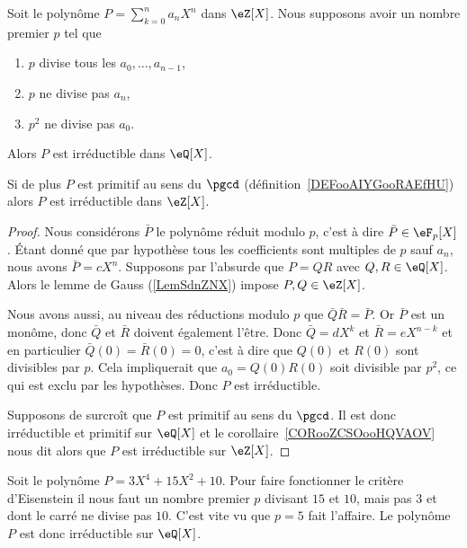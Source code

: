 \begin{proposition}
    Soit le polynôme \( P=\sum_{k=0}^n a_nX^n\) dans \( \eZ[X]\). Nous supposons avoir un nombre premier \( p\) tel que
    \begin{enumerate}
        \item
            \( p\) divise tous les \( a_0,\ldots, a_{n-1}\),
        \item
            \( p\) ne divise pas \( a_n\),
        \item
            \( p^2\) ne divise pas \( a_0\).
    \end{enumerate}
    Alors \( P\) est irréductible dans \( \eQ[X]\).

    Si de plus \( P\) est primitif au sens du \( \pgcd\) (définition~\ref{DEFooAIYGooRAEfHU}) alors \( P\) est irréductible dans \( \eZ[X]\).
\end{proposition}

\begin{proof}
    Nous considérons \( \bar P\) le polynôme réduit modulo \( p\), c'est à dire \( \bar P\in \eF_p[X]\). Étant donné que par hypothèse tous les coefficients sont multiples de \( p\) sauf \( a_n\), nous avons \( \bar P=cX^n\). Supposons par l'absurde que \( P=QR\) avec \( Q,R\in \eQ[X]\). Alors le lemme de Gauss (\ref{LemSdnZNX}) impose \( P,Q\in \eZ[X]\).

    Nous avons aussi, au niveau des réductions modulo \( p\) que $\bar Q\bar R=\bar P$. Or \( \bar P\) est un monôme, donc \( \bar Q\) et \( \bar R\) doivent également l'être. Donc \( \bar Q=dX^k\) et \( \bar R=eX^{n-k}\) et en particulier \( \bar Q(0)=\bar R(0)=0\), c'est à dire que \( Q(0)\) et \( R(0)\) sont divisibles par \( p\). Cela impliquerait que \( a_0=Q(0)R(0)\) soit divisible par \( p^2\), ce qui est exclu par les hypothèses. Donc \( P\) est irréductible.

    Supposons de surcroît que \( P\) est primitif au sens du \( \pgcd\). Il est donc irréductible et primitif sur \( \eQ[X]\) et le corollaire~\ref{CORooZCSOooHQVAOV} nous dit alors que \( P\) est irréductible sur \( \eZ[X]\).
\end{proof}

\begin{example}
    Soit le polynôme \( P=3X^4+15 X^2+10\). Pour faire fonctionner le critère d'Eisenstein il nous faut un nombre premier \( p\) divisant \( 15\) et \( 10\), mais pas \( 3\) et dont le carré ne divise pas \( 10\). C'est vite vu que \( p=5\) fait l'affaire. Le polynôme \( P\) est donc irréductible sur \( \eQ[X]\).
\end{example}

